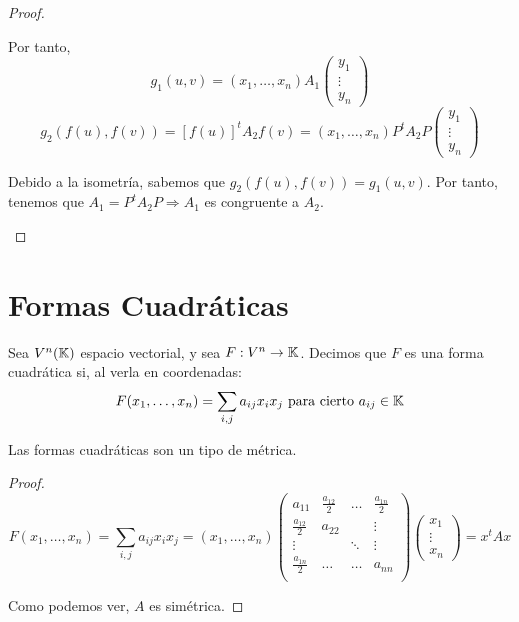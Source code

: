 \begin{proof}
\begin{description}
    Por tanto,
    \begin{equation*}
        g_1(u,v) = (x_1, \dots, x_n) A_1\left(\begin{array}{c}
        y_1 \\ \vdots \\ y_n
    \end{array}\right)
    \end{equation*}
    \begin{equation*}
        g_2(f(u),f(v)) = [f(u)]^tA_2f(v) = (x_1, \dots, x_n)P^t A_2 P\left(\begin{array}{c}
        y_1 \\ \vdots \\ y_n
    \end{array}\right)
    \end{equation*}

    Debido a la isometría, sabemos que $g_2(f(u),f(v)) = g_1(u,v)$. Por tanto, tenemos que $A_1 = P^tA_2P \Longrightarrow A_1$ es congruente a $A_2$.
\end{description}
    
\end{proof}

\section{Formas Cuadráticas}
\begin{definicion}
    Sea $V^n(\mathbb{K})$ espacio vectorial, y sea $F:V^n\to \mathbb{K}$. Decimos que $F$ es una forma cuadrática si, al verla en coordenadas:
    \begin{equation*}
        F(x_1,\dots,x_n) = \sum_{i,j}a_{ij}x_ix_j \text{ para cierto }a_{ij}\in\mathbb{K}
    \end{equation*}
\end{definicion}

\begin{prop}
    Las formas cuadráticas son un tipo de métrica.
\end{prop}
\begin{proof}
    \begin{equation*}
        F(x_1,\dots,x_n) = \sum_{i,j}a_{ij}x_ix_j  = (x_1,\dots,x_n)\left( \begin{array}{cccc}
            a_{11} & \frac{a_{12}}{2} & \dots & \frac{a_{1n}}{2} \\
            \frac{a_{12}}{2} & a_{22} &  & \vdots \\
            \vdots & & \ddots & \vdots \\
            \frac{a_{1n}}{2} & \dots & \dots & a_{nn} \\
        \end{array}\right)
        \left(\begin{array}{c}
            x_1 \\ \vdots \\ x_n
        \end{array}\right) = x^tAx
    \end{equation*}

    Como podemos ver, $A$ es simétrica.
\end{proof}

